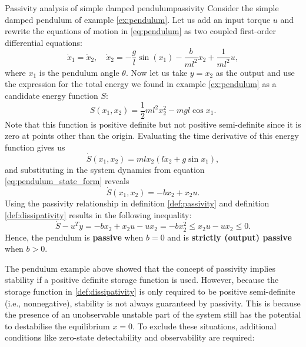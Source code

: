 \begin{example}{Passivity analysis of simple damped pendulum}{passivity}
  Consider the simple damped pendulum of example \ref{ex:pendulum}. Let us add an input torque $u$ and rewrite the equations of motion in \eqref{eq:pendulum} as two coupled first-order differential equations:
  \begin{equation} \label{eq:pendulum_state_form}
    \dot{x}_1 = \dot{x}_2, \quad \dot{x}_2 = -\frac{g}{l} \sin(x_1) - \frac{b}{ml^2}x_2 + \frac{1}{ml^2}u,
  \end{equation}
  where $x_1$ is the pendulum angle $\theta$. Now let us take $y = x_2$ as the output and use the expression for the total energy we found in example \ref{ex:pendulum} as a candidate energy function $S$:
  \begin{equation}
    S \left(x_1, x_2 \right) = \frac{1}{2} m l^2 x_2^2 - mgl \cos{x_1}.
  \end{equation}
  Note that this function is positive definite but not positive semi-definite since it is zero at points other than the origin. Evaluating the time derivative of this energy function gives us
  \begin{equation}
    \dot{S}\left(x_1, x_2\right) = ml x_2 \left( l \dot{x}_2 + g \sin{x_1}\right),
  \end{equation}
  and substituting in the system dynamics from equation \eqref{eq:pendulum_state_form} reveals
  \begin{equation}
    \dot{S}\left(x_1, x_2 \right) = -b x_2 + x_2 u.
  \end{equation}
  Using the passivity relationship in definition \ref{def:passivity} and definition \ref{def:dissipativity} results in the following inequality:
  \begin{equation}
    \dot{S} - u^T y = -b x_2 + x_2 u - u x_2 = -b x_ 2^2 \le x_2 u - u x_2 \le 0.
  \end{equation}
  Hence, the pendulum is \textbf{passive} when $b = 0$ and is \textbf{strictly (output) passive} when $b > 0$.
\end{example}

The pendulum example above showed that the concept of passivity implies stability if a positive definite storage function is used. However, because the storage function in \ref{def:dissipativity} is only required to be positive semi-definite (i.e., nonnegative), stability is not always guaranteed by passivity. This is because the presence of an unobservable unstable part of the system still has the potential to destabilise the equilibrium $x=0$. To exclude these situations, additional conditions like zero-state detectability and observability are required:


